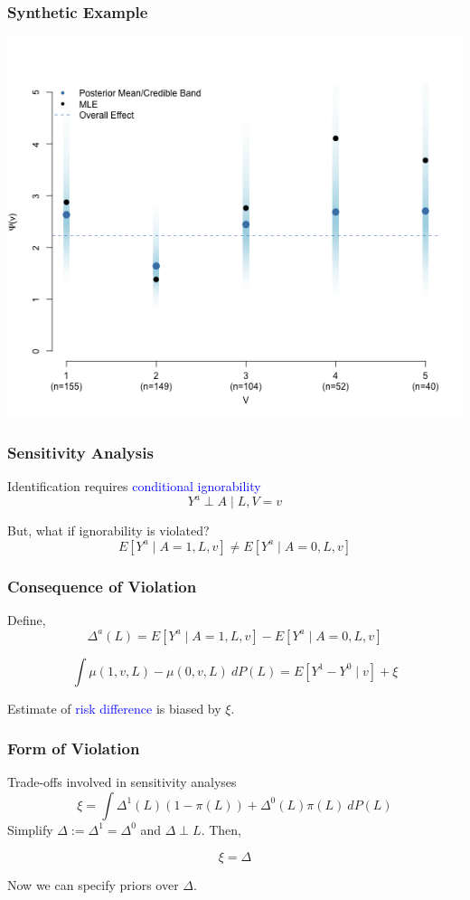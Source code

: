\documentclass[xcolor=x11names,compress]{beamer}
\renewcommand{\(}{\begin{columns}}
\renewcommand{\)}{\end{columns}}
\newcommand{\<}[1]{\begin{column}{#1}}
\renewcommand{\>}{\end{column}}
\begin{document}
\begin{frame}
	\frametitle{Synthetic Example}
	\centerline{\includegraphics[scale=.4]{../code/ppooling_plot.png}}
\end{frame}


\begin{frame}
	\frametitle{Sensitivity Analysis}
	
	Identification requires \textcolor{blue}{conditional ignorability}
	$$ Y^a \perp A \mid L, V=v $$

	But, what if ignorability is violated?
	$$ E[Y^a \mid A=1, L, v] \neq E[Y^a \mid A=0, L, v]  $$
\end{frame}

\begin{frame}
	\frametitle{Consequence of Violation}
	
	Define, 	
	$$\Delta^a(L)  = E[Y^a \mid A=1, L, v] - E[Y^a \mid A=0, L, v] $$
	
	 
	$$\int \mu(1,v, L) - \mu(0, v, L) \ dP(L)  = E[Y^1 - Y^0 \mid v ] + \xi$$
	
	Estimate of \textcolor{blue}{risk difference} is biased by $\xi$.
		
\end{frame}


\begin{frame}
	\frametitle{Form of Violation}
	Trade-offs involved in sensitivity analyses
	$$ \xi = \int \Delta^1(L)(1- \pi(L)) + \Delta^0(L) \pi(L)  \ dP(L) $$
	Simplify $ \Delta := \Delta^1 = \Delta^0$ and $ \Delta \perp L$. Then, 
	
	$$ \xi = \Delta $$
	
	Now we can specify priors over $\Delta$.
\end{frame}
\end{document}
